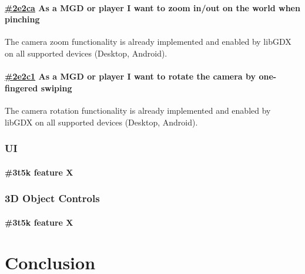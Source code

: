 \documentclass[10pt]{extarticle} %
\begin{document}
    \paragraph{\href{https://app.clickup.com/757520/761304/t/2e2ca}{\#2e2ca} As a MGD or player I want to zoom in/out on the world when pinching}
    The camera zoom functionality is already implemented and enabled by libGDX on all supported devices (Desktop, Android).
    \paragraph{\href{https://app.clickup.com/757520/761304/t/2e2c1}{\#2e2c1} As a MGD or player I want to rotate the camera by one-fingered swiping}
    The camera rotation functionality is already implemented and enabled by libGDX on all supported devices (Desktop, Android).

    \subsubsection{UI}
    \paragraph{\#3t5k feature X}

    \subsubsection{3D Object Controls}
    \paragraph{\#3t5k feature X}

    \newpage

    \section {Conclusion}

    \newpage

    
\end{document}
